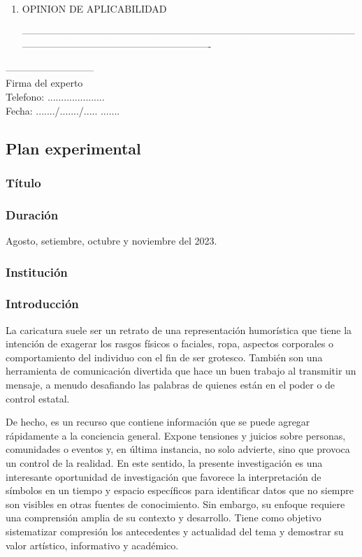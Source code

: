 \documentclass[12pt,a4paper]{article}
\begin{document}
\begin{enumerate}
	\item OPINION DE APLICABILIDAD

	      ----------------------------------------------------------------------------------------------------------------------------------------------------------------
\end{enumerate}

\begin{center}

	---------------------------\\
	Firma del experto\\
	Telefono: .....................\\
	Fecha: ......./......./.....	.......
\end{center}


\subsection{Plan experimental}
\subsubsection{Título} \titulo
\subsubsection{Duración} Agosto, setiembre, octubre y noviembre del 2023.
\subsubsection{Institución} \lugar
\subsubsection{Introducción}

La caricatura suele ser un retrato de una representación humorística que tiene la intención de exagerar los rasgos físicos o faciales, ropa, aspectos corporales o comportamiento del individuo con el fin de ser grotesco.  También son una herramienta de comunicación divertida que hace un buen trabajo al transmitir un mensaje, a menudo desafiando las palabras de quienes están en el poder o de control estatal. 

De hecho, es un recurso que contiene información que se puede agregar rápidamente a la conciencia general. Expone tensiones y juicios sobre personas, comunidades o eventos y, en última instancia, no solo advierte, sino que provoca un control de la realidad. En este sentido, la presente investigación es una interesante oportunidad de investigación que favorece la interpretación de símbolos en un tiempo y  espacio específicos para identificar datos que no siempre son visibles en otras fuentes de conocimiento. Sin embargo, su enfoque requiere una comprensión amplia de su contexto y desarrollo. Tiene como objetivo sistematizar compresión los antecedentes y actualidad del tema y demostrar su valor artístico, informativo y académico. 
\end{document}
